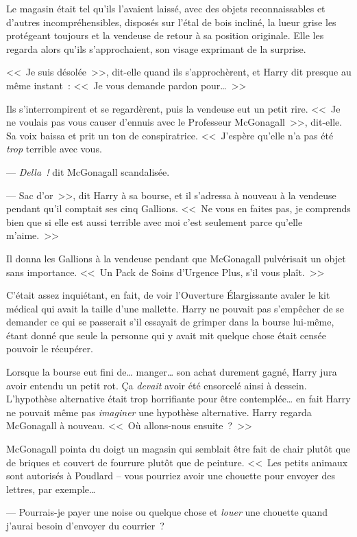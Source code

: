 \later

Le magasin était tel qu'ils l'avaient laissé, avec des objets reconnaissables et d'autres incompréhensibles, disposés sur l'étal de bois incliné, la lueur grise les protégeant toujours et la vendeuse de retour à sa position originale. Elle les regarda alors qu'ils s'approchaient, son visage exprimant de la surprise.

<<~Je suis désolée~>>, dit-elle quand ils s'approchèrent, et Harry dit presque au même instant~: <<~Je vous demande pardon pour…~>>

Ils s'interrompirent et se regardèrent, puis la vendeuse eut un petit rire.
<<~Je ne voulais pas vous causer d'ennuis avec le Professeur McGonagall~>>, dit-elle. Sa voix baissa et prit un ton de conspiratrice. <<~J'espère qu'elle n'a pas été \emph{trop} terrible avec vous.

--- \emph{Della~!} dit McGonagall scandalisée.

--- Sac d'or~>>, dit Harry à sa bourse, et il s'adressa à nouveau à la vendeuse pendant qu'il comptait ses cinq Gallions. <<~Ne vous en faites pas, je comprends bien que si elle est aussi terrible avec moi c'est seulement parce qu'elle m'aime.~>>

Il donna les Gallions à la vendeuse pendant que McGonagall pulvérisait un objet sans importance. <<~Un Pack de Soins d'Urgence Plus, s'il vous plaît.~>>

C'était assez inquiétant, en fait, de voir l'Ouverture Élargissante avaler le kit médical qui avait la taille d'une mallette. Harry ne pouvait pas s'empêcher de se demander ce qui se passerait s'il essayait de grimper dans la bourse lui-même, étant donné que seule la personne qui y avait mit quelque chose était censée pouvoir le récupérer.

Lorsque la bourse eut fini de… manger… son achat durement gagné, Harry jura avoir entendu un petit rot. Ça \emph{devait} avoir été ensorcelé ainsi à dessein. L'hypothèse alternative était trop horrifiante pour être contemplée… en fait Harry ne pouvait même pas \emph{imaginer} une hypothèse alternative. Harry regarda McGonagall à nouveau. <<~Où allons-nous ensuite~?~>>

McGonagall pointa du doigt un magasin qui semblait être fait de chair plutôt que de briques et couvert de fourrure plutôt que de peinture.
<<~Les petits animaux sont autorisés à Poudlard -- vous pourriez avoir une chouette pour envoyer des lettres, par exemple…

--- Pourrais-je payer une noise ou quelque chose et \emph{louer} une chouette quand j'aurai besoin d'envoyer du courrier~?


